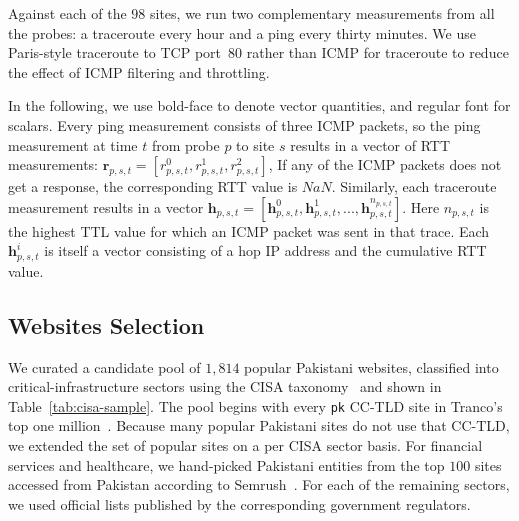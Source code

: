 \documentclass[sigconf,anonymous,10pt]{acmart}
\begin{document}
Against each of the $98$ sites, we run two complementary measurements from all the probes: a traceroute every hour and a ping every thirty minutes. %
We use Paris-style traceroute to TCP port~$80$ rather than ICMP for traceroute to reduce the effect of ICMP filtering and throttling. %

In the following, we use bold-face to denote vector quantities, and regular font for scalars. Every ping measurement consists of three ICMP packets, so the ping measurement at time $t$ from probe $p$ to site $s$ results in a vector of RTT measurements: $\textbf{r}_{p, s, t} = [r_{p, s, t}^0, r_{p, s, t}^1, r_{p, s, t}^2]$, If any of the ICMP packets does not get a response, the corresponding RTT value is $NaN$. Similarly, each
traceroute measurement results in a vector $\textbf{h}_{p, s, t} = [\textbf{h}_{p, s, t}^0,
\textbf{h}_{p, s, t}^1, ..., \textbf{h}_{p, s, t}^{n_{p, s, t}}]$. Here $n_{p, s, t}$ is the
highest TTL value for which an ICMP packet was sent in that trace. Each $\textbf{h}_{p, s,
t}^i$ is itself a vector consisting of a hop IP address and the cumulative RTT value.
\subsection{Websites Selection}
\label{subsec:sites}

We curated a candidate pool of $1,814$ popular Pakistani websites, classified into critical-infrastructure sectors using the CISA taxonomy~\cite{cisa} and shown in Table~\ref{tab:cisa-sample}. The pool begins with every \texttt{pk} CC-TLD site in Tranco's top one million~\cite{tranco}. Because many popular Pakistani sites do not use that CC-TLD, we extended the set of popular sites on a per CISA sector basis. For financial services and healthcare, we hand-picked Pakistani entities from the top $100$ sites accessed from Pakistan according to Semrush~\cite{semrush}. For each of the remaining sectors, we used official lists published by the corresponding government regulators.
\end{document}
